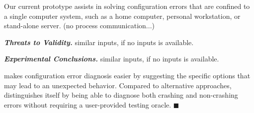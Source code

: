 Our current \ourtool prototype assists in solving configuration errors that are confined
to a single computer system, such as a home computer, personal workstation, or stand-alone server. (no process communication...)

\vspace{1mm}

\noindent \textbf{\textit{Threats to Validity.}} similar inputs, if no inputs is available.

\vspace{1mm}

\noindent \textbf{\textit{Experimental Conclusions.}} similar inputs, if no inputs is available.

\ourtool makes configuration error diagnosis easier by suggesting
the specific options that may lead to an unexpected behavior. Compared to
alternative approaches, \ourtool distinguishes itself by being able to
diagnose both crashing and non-crashing errors without requiring
a user-provided testing oracle. $\blacksquare$
